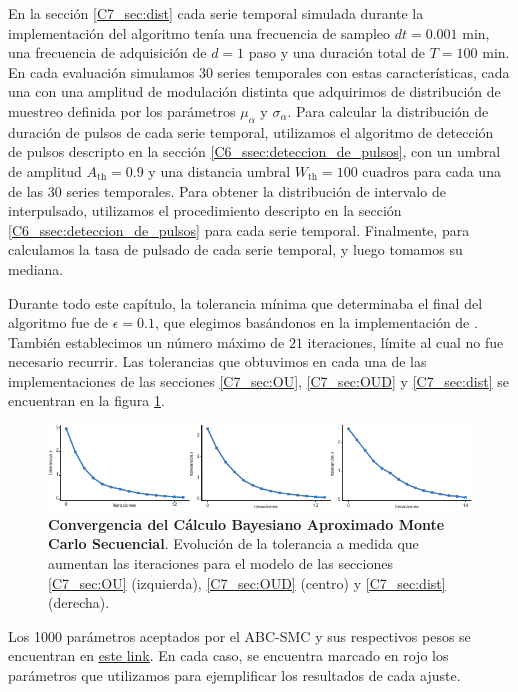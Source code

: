\documentclass[./main.tex]{subfiles}
\begin{document}
\begin{subappendices}
En la sección \ref{C7_sec:dist} cada serie temporal simulada durante la implementación del algoritmo tenía una frecuencia de sampleo $dt = 0.001 \text{ min}$, una frecuencia de adquisición de $d = 1$ paso y una duración total de $T = 100 \text{ min}$. En cada evaluación simulamos $30$ series temporales con estas características, cada una con una amplitud de modulación distinta que adquirimos de distribución de muestreo definida por los parámetros $\mu_{\alpha}$ y $\sigma_{\alpha}$. Para calcular la distribución de duración de pulsos de cada serie temporal, utilizamos el algoritmo de detección de pulsos descripto en la sección \ref{C6_ssec:deteccion_de_pulsos}, con un umbral de amplitud $A_{\text{th}} = 0.9$ y una distancia umbral $W_{\text{th}} = 100 \text{ cuadros}$ para cada una de las 30 series temporales.  Para obtener la distribución de intervalo de interpulsado,  utilizamos el procedimiento descripto en la sección \ref{C6_ssec:deteccion_de_pulsos} para cada serie temporal. Finalmente, para calculamos la tasa de pulsado de cada serie temporal, y luego tomamos su mediana. 


Durante todo este capítulo, la tolerancia mínima que determinaba el final del algoritmo fue de $\epsilon = 0.1$, que elegimos basándonos en la implementación de \cite{Costa2021}. También establecimos un número máximo de $21$ iteraciones, límite al cual no fue necesario recurrir. Las tolerancias que obtuvimos en cada una de las implementaciones de las secciones  \ref{C7_sec:OU}, \ref{C7_sec:OUD} y \ref{C7_sec:dist} se encuentran en la figura 
\ref{C7_fig:ap_eps}.

\begin{figure}
    \centering
    \includegraphics[width=1\columnwidth]{figures/chapter7/C7_eps.pdf} 
    \caption{\textbf{Convergencia del Cálculo Bayesiano Aproximado Monte Carlo Secuencial}. Evolución de la tolerancia a medida que aumentan las iteraciones para el modelo de las secciones \ref{C7_sec:OU} (izquierda),  \ref{C7_sec:OUD} (centro) y  \ref{C7_sec:dist} (derecha).}
    \label{C7_fig:ap_eps}
\end{figure} 


Los 1000 parámetros aceptados por el ABC-SMC y sus respectivos pesos se encuentran en \href{https://github.com/fiorefabris/parameters}{\underline{este link}}. En cada caso, se encuentra marcado en rojo los parámetros que utilizamos para ejemplificar los resultados de cada ajuste.


\end{subappendices}
\end{document}
